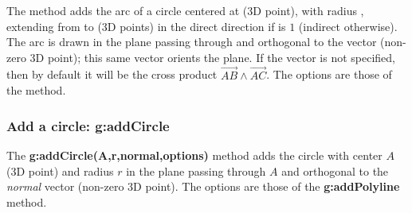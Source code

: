 The  method adds the arc of a circle centered at  (3D point), with radius , extending from  to  (3D points) in the direct direction if  is $1$ (indirect otherwise). The arc is drawn in the plane passing through  and orthogonal to the  vector (non-zero 3D point); this same vector orients the plane. If the vector  is not specified, then by default it will be the cross product $\vec{AB}\wedge\vec{AC}$. The options are those of the  method.

\subsubsection{Add a circle: g:addCircle}

The \textbf{g:addCircle(A,r,normal,options)} method adds the circle with center $A$ (3D point) and radius $r$ in the plane passing through $A$ and orthogonal to the \emph{normal} vector (non-zero 3D point). The options are those of the \textbf{g:addPolyline} method.

